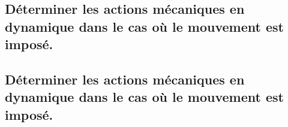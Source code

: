 \documentclass[10pt,fleqn]{book}
\newcommand{\repRel}{../..}
\newcommand{\repStyle}{\repRel/Style}
\newcommand{\td}{fichier_td}
\newcommand{\repExos}{\repRel/ExercicesCompetences}
\newcommand{\repExo}{dossier}
\begin{document}
\renewcommand{\repExo}{\repExos/C2_MettreEnOeuvreDemarche/C2_07_PFS/64_EPAS}
\renewcommand{\td}{64_EPAS}
\graphicspath{{\repStyle/png/}{\repExo/images/}}


\subsection{Déterminer les actions mécaniques en dynamique dans le cas où le mouvement est imposé.} 

\subsection{Déterminer les actions mécaniques en dynamique dans le cas où le mouvement est imposé.} 

\renewcommand{\repExo}{\repExos/C2_MettreEnOeuvreDemarche/C2_08_PFD/50_BancBalafre}
\renewcommand{\td}{50_BancBalafre}
\graphicspath{{\repStyle/png/}{\repExo/images/}}


\renewcommand{\repExo}{\repExos/C2_MettreEnOeuvreDemarche/C2_08_TorseurDynamique/01_T}
\renewcommand{\td}{01_T}
\graphicspath{{\repStyle/png/}{\repExo/images/}}


\renewcommand{\repExo}{\repExos/C2_MettreEnOeuvreDemarche/C2_08_TorseurDynamique/01_T_02}
\renewcommand{\td}{01_T_02}
\graphicspath{{\repStyle/png/}{\repExo/images/}}


\renewcommand{\repExo}{\repExos/C2_MettreEnOeuvreDemarche/C2_08_TorseurDynamique/02_R}
\renewcommand{\td}{02_R}
\graphicspath{{\repStyle/png/}{\repExo/images/}}


\renewcommand{\repExo}{\repExos/C2_MettreEnOeuvreDemarche/C2_08_TorseurDynamique/03_TT}
\renewcommand{\td}{03_TT}
\graphicspath{{\repStyle/png/}{\repExo/images/}}


\renewcommand{\repExo}{\repExos/C2_MettreEnOeuvreDemarche/C2_08_TorseurDynamique/04_RR}
\renewcommand{\td}{04_RR}
\graphicspath{{\repStyle/png/}{\repExo/images/}}


\renewcommand{\repExo}{\repExos/C2_MettreEnOeuvreDemarche/C2_08_TorseurDynamique/05_RT}
\renewcommand{\td}{05_RT}
\graphicspath{{\repStyle/png/}{\repExo/images/}}


\renewcommand{\repExo}{\repExos/C2_MettreEnOeuvreDemarche/C2_08_TorseurDynamique/06_TR}
\renewcommand{\td}{06_TR}
\graphicspath{{\repStyle/png/}{\repExo/images/}}

\end{document}
